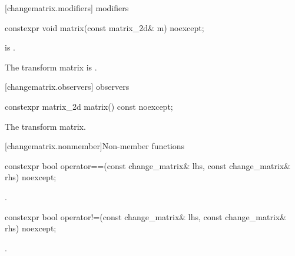  [changematrix.modifiers]{ modifiers}%

\begin{itemdecl}
constexpr void matrix(const matrix_2d& m) noexcept;
\end{itemdecl}
\begin{itemdescr}
\pnum
\requires
{} is .

\pnum
\effects
The transform matrix is .
\end{itemdescr}

 [changematrix.observers]{ observers}

\begin{itemdecl}
constexpr matrix_2d matrix() const noexcept;
\end{itemdecl}
\begin{itemdescr}
\pnum
\returns
The transform matrix.
\end{itemdescr}

 [changematrix.nonmember]{Non-member functions}%

%
\begin{itemdecl}
constexpr bool operator==(const change_matrix& lhs, const change_matrix& rhs) 
  noexcept;
\end{itemdecl}
\begin{itemdescr}
\pnum
\returns
{}.
\end{itemdescr}

%
\begin{itemdecl}
constexpr bool operator!=(const change_matrix& lhs, const change_matrix& rhs) 
  noexcept;
\end{itemdecl}
\begin{itemdescr}
\pnum
\returns
{}.
\end{itemdescr}
